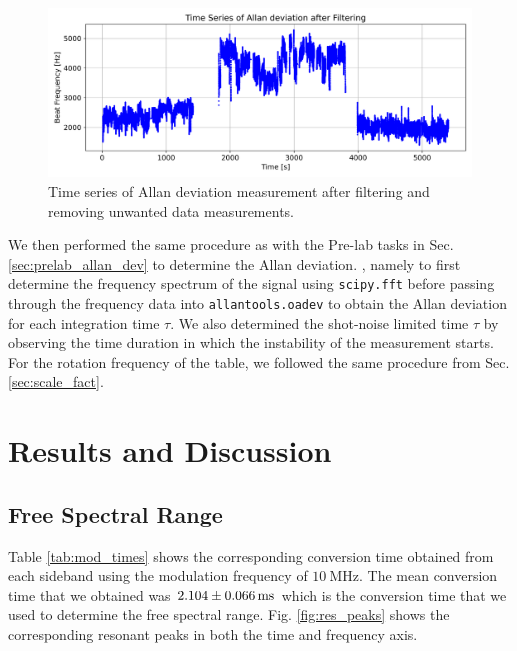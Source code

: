 \documentclass[a4paper]{report}
\numberwithin{equation}{section}
\begin{document}
\begin{figure}[h!]
	\centering
	\includegraphics[width=0.8\columnwidth]{allan_ts_filt.png}
	\caption{Time series of Allan deviation measurement after filtering and removing unwanted data measurements.}
	\label{fig:allan_ts_filt}
\end{figure}

We then performed the same procedure as with the Pre-lab tasks in Sec. \ref{sec:prelab_allan_dev} to determine the Allan deviation.
, namely to first determine the frequency spectrum of the signal using \texttt{scipy.fft} before passing through the frequency data into \texttt{allantools.oadev}
to obtain the Allan deviation for each integration time $\tau$. We also determined the shot-noise limited time $\tau$ by observing the time duration in which the instability of the 
measurement starts. For the rotation frequency of the table, we followed the same procedure from Sec. \ref{sec:scale_fact}. \par 



\chapter{Results and Discussion}

\section{Free Spectral Range} \label{sec:fsr}

Table \ref{tab:mod_times} shows the corresponding conversion time obtained from each sideband using the modulation frequency of $\SI{10}{\mega\hertz}$.
The mean conversion time that we obtained was $\SI{2.104 \pm 0.066}{\milli\second}$ which is the conversion time
that we used to determine the free spectral range. Fig. \ref{fig:res_peaks} shows the corresponding resonant peaks in both the time and frequency axis. \par
\end{document}
